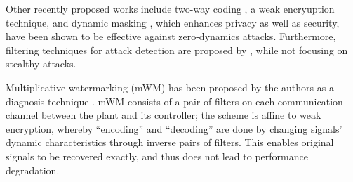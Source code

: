 Other recently proposed works include two-way coding \citep{fang2019two}, a weak encryuption technique, and dynamic masking \citep{abdalmoaty2023privacy}, which enhances privacy as well as security, have been shown to be effective against zero-dynamics attacks.
Furthermore, filtering techniques for attack detection are proposed by \cite{murguia2020security,hashemi2022codesign,escudero2023safety}, while not focusing on stealthy attacks.

Multiplicative watermarking (mWM) has been proposed by the authors as a diagnosis technique \citep{ferrari2020switching}. mWM consists of a pair of filters on each communication channel between the plant and its controller; the scheme is affine to weak encryption, whereby ``encoding'' and ``decoding'' are done by changing signals' dynamic characteristics through inverse pairs of filters. This enables original signals to be recovered exactly, and thus does not lead to performance degradation.

%
